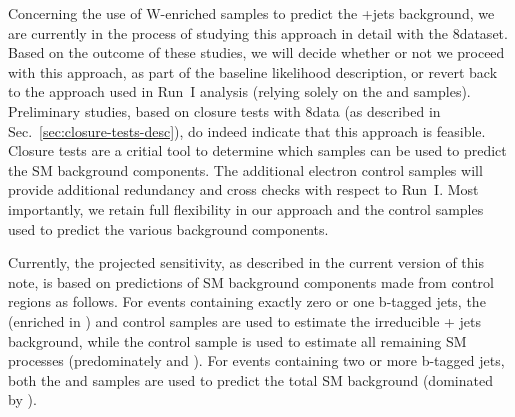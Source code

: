 Concerning the use of W-enriched samples to predict the \znunu +jets
background, we are currently in the process of studying this approach
in detail with the 8\TeV dataset. Based on the outcome of these studies,
we will decide whether or not we proceed with this approach, as part
of the baseline likelihood description, or revert back to the approach
used in Run~I analysis (\ie relying solely on the \zll and \gj
samples). Preliminary studies, based on closure tests with 8\TeV data
(as described in Sec.~\ref{sec:closure-tests-desc}), do indeed
indicate that this approach is feasible. Closure tests are a critial
tool to determine which samples can be used to predict the SM
background components. The additional electron control samples will
provide additional redundancy and cross checks with respect to Run~I. 
Most importantly, we retain full flexibility in our approach and the
control samples used to predict the various background components.

Currently, the projected sensitivity, as described in the current
version of this note, is based on predictions of SM background
components made from control regions as follows. For events containing
exactly zero or one b-tagged jets, the \ej (enriched in \wej) and \gj
control samples are used to estimate the irreducible \znunu + jets
background, while the \mj control sample is used to estimate all
remaining SM processes (predominately \wj and \ttbar). For events
containing two or more b-tagged jets, both the \mj and \ej samples are
used to predict the total SM background (dominated by \ttbar).

